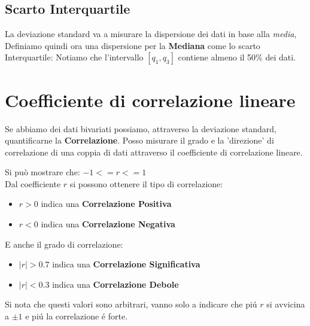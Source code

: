 \subsection{Scarto Interquartile}
La deviazione standard va a misurare la dispersione dei dati in base alla \emph{media}, 
Definiamo quindi ora una dispersione per la \textbf{Mediana} come lo scarto Interquartile:
Notiamo che l'intervallo $[q_1,q_3]$ contiene almeno il 50\% dei dati.

\section{Coefficiente di correlazione lineare}
Se abbiamo dei dati bivariati possiamo, attraverso la deviazione standard, quantificarne la \textbf{Correlazione}.
Posso misurare il grado e la 'direzione' di correlazione di una coppia di dati attraverso il coefficiente di correlazione lineare. 

Si può mostrare che: $-1<=r<=1$
\\Dal coefficiente $r$ si possono ottenere il tipo di correlazione:
\begin{itemize}
    \item $r > 0$ indica una \textbf{Correlazione Positiva }
    \item $r < 0$ indica una \textbf{Correlazione Negativa }
\end{itemize}
E anche il grado di correlazione:
\begin{itemize}
    \item $|r| > 0.7$ indica una \textbf{Correlazione Significativa}
    \item $|r| < 0.3$ indica una \textbf{Correlazione Debole}
\end{itemize}
Si nota che questi valori sono arbitrari, vanno solo a indicare che piú $r$ si avvicina a $\pm 1$ e piú la correlazione é forte.